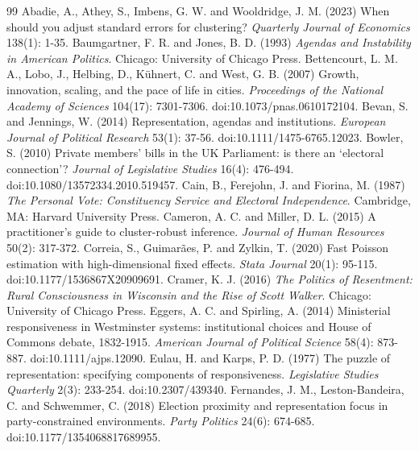 \documentclass[11pt,a4paper]{article}
\begin{document}

\begin{thebibliography}{99}
 Abadie, A., Athey, S., Imbens, G. W. and Wooldridge, J. M. (2023) When should you adjust standard errors for clustering? \emph{Quarterly Journal of Economics} 138(1): 1-35.
 Baumgartner, F. R. and Jones, B. D. (1993) \emph{Agendas and Instability in American Politics}. Chicago: University of Chicago Press.
 Bettencourt, L. M. A., Lobo, J., Helbing, D., K\"uhnert, C. and West, G. B. (2007) Growth, innovation, scaling, and the pace of life in cities. \emph{Proceedings of the National Academy of Sciences} 104(17): 7301-7306. doi:10.1073/pnas.0610172104.
 Bevan, S. and Jennings, W. (2014) Representation, agendas and institutions. \emph{European Journal of Political Research} 53(1): 37-56. doi:10.1111/1475-6765.12023.
 Bowler, S. (2010) Private members' bills in the UK Parliament: is there an `electoral connection'? \emph{Journal of Legislative Studies} 16(4): 476-494. doi:10.1080/13572334.2010.519457.
 Cain, B., Ferejohn, J. and Fiorina, M. (1987) \emph{The Personal Vote: Constituency Service and Electoral Independence}. Cambridge, MA: Harvard University Press.
 Cameron, A. C. and Miller, D. L. (2015) A practitioner's guide to cluster-robust inference. \emph{Journal of Human Resources} 50(2): 317-372.
 Correia, S., Guimar\~aes, P. and Zylkin, T. (2020) Fast Poisson estimation with high-dimensional fixed effects. \emph{Stata Journal} 20(1): 95-115. doi:10.1177/1536867X20909691.
 Cramer, K. J. (2016) \emph{The Politics of Resentment: Rural Consciousness in Wisconsin and the Rise of Scott Walker}. Chicago: University of Chicago Press.
 Eggers, A. C. and Spirling, A. (2014) Ministerial responsiveness in Westminster systems: institutional choices and House of Commons debate, 1832-1915. \emph{American Journal of Political Science} 58(4): 873-887. doi:10.1111/ajps.12090.
 Eulau, H. and Karps, P. D. (1977) The puzzle of representation: specifying components of responsiveness. \emph{Legislative Studies Quarterly} 2(3): 233-254. doi:10.2307/439340.
 Fernandes, J. M., Leston-Bandeira, C. and Schwemmer, C. (2018) Election proximity and representation focus in party-constrained environments. \emph{Party Politics} 24(6): 674-685. doi:10.1177/1354068817689955.

\end{thebibliography}
\end{document}
